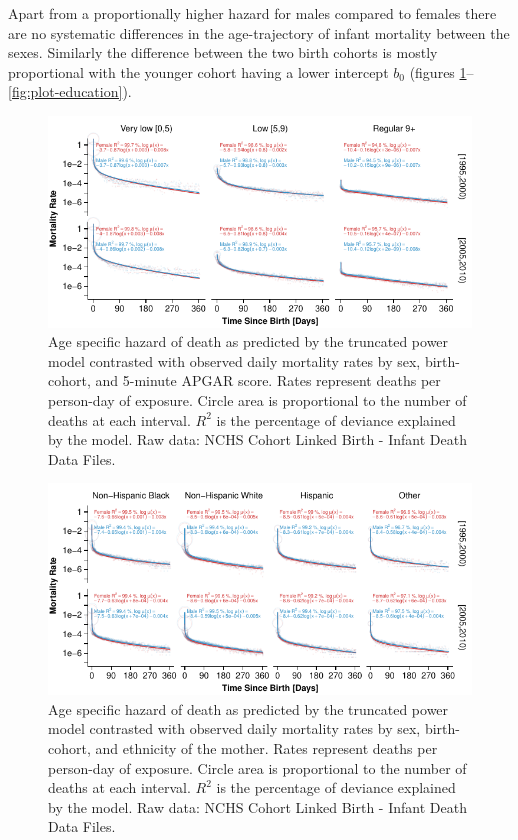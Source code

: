 \documentclass[smallextended]{svjour3} %
\makeatletter
\def\maxwidth{\ifdim\Gin@nat@width>\linewidth\linewidth
\else\Gin@nat@width\fi}
\let\Oldincludegraphics\includegraphics
\renewcommand{\includegraphics}[1]{\Oldincludegraphics[width=\maxwidth]{#1}}
\makeatother
\begin{document}
Apart from a proportionally higher hazard for males compared to females
there are no systematic differences in the age-trajectory of infant
mortality between the sexes. Similarly the difference between the two
birth cohorts is mostly proportional with the younger cohort having a
lower intercept \(b_0\) (figures
\ref{fig:plot-apgar}--\ref{fig:plot-education}).

\begin{figure}
\centering
\includegraphics{fig/plot_apgar.pdf}
\caption{\label{fig:plot-apgar}Age specific hazard of death as predicted by
the truncated power model contrasted with observed daily mortality rates
by sex, birth-cohort, and 5-minute APGAR score. Rates represent deaths
per person-day of exposure. Circle area is proportional to the number of
deaths at each interval. \(R^2\) is the percentage of deviance explained
by the model. Raw data: NCHS Cohort Linked Birth - Infant Death Data
Files.}
\end{figure}

\begin{figure}
\centering
\includegraphics{fig/plot_origin.pdf}
\caption{\label{fig:plot-origin}Age specific hazard of death as predicted by
the truncated power model contrasted with observed daily mortality rates
by sex, birth-cohort, and ethnicity of the mother. Rates represent
deaths per person-day of exposure. Circle area is proportional to the
number of deaths at each interval. \(R^2\) is the percentage of deviance
explained by the model. Raw data: NCHS Cohort Linked Birth - Infant
Death Data Files.}
\end{figure}
\end{document}
